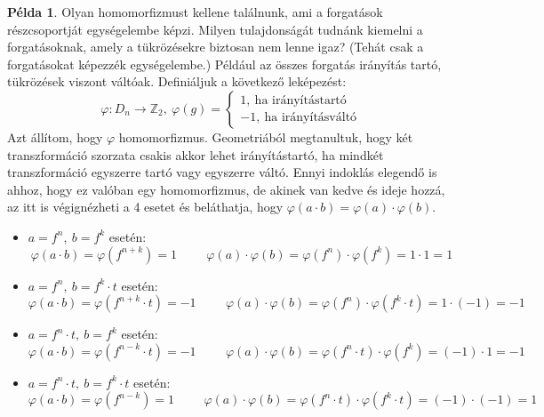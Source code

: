 \documentclass[12pt]{book}
\theoremstyle{plain} %
\theoremstyle{definition} %
\newtheorem{pl}{Példa}[section]
\theoremstyle{remark}
\numberwithin{equation}{section}  %
\def\Z{\mathbb{Z}}
\begin{document}
	\begin{pl}
		Olyan homomorfizmust kellene találnunk, ami a forgatások részcsoportját egységelembe képzi. Milyen tulajdonságát tudnánk kiemelni a forgatásoknak, amely a tükrözésekre biztosan nem lenne igaz? (Tehát csak a forgatásokat képezzék egységelembe.) Például az összes forgatás irányítás tartó, tükrözések viszont váltóak. Definiáljuk a következő leképezést:
		\[ \varphi\colon D_n \to \Z_2,\ \varphi(g) = 
		\begin{cases}
			1,\ \text{ha irányítástartó} \\
			-1,\ \text{ha irányításváltó}
		\end{cases}
		\]
		Azt állítom, hogy $\varphi$ homomorfizmus. Geometriából megtanultuk, hogy két transzformáció szorzata csakis akkor lehet irányítástartó, ha mindkét transzformáció egyszerre tartó vagy egyszerre váltó. Ennyi indoklás elegendő is ahhoz, hogy ez valóban egy homomorfizmus, de akinek van kedve és ideje hozzá, az itt is végignézheti a 4 esetet és beláthatja, hogy $\varphi(a\cdot b) = \varphi(a)\cdot \varphi(b)$.
		\begin{itemize}
			\item $a=f^n,\ b=f^k$ esetén: \[ \varphi(a\cdot b) = \varphi(f^{n+k}) = 1 \hspace{1cm} \varphi(a)\cdot \varphi(b) =  \varphi(f^n) \cdot \varphi(f^k) = 1\cdot 1 = 1 \]
			\item $a=f^n,\ b=f^k\cdot t$ esetén: \[ \varphi(a\cdot b) = \varphi(f^{n+k}\cdot t) = -1 \hspace{1cm} \varphi(a)\cdot \varphi(b) = \varphi(f^n) \cdot \varphi(f^k\cdot t) = 1\cdot (-1) = -1 \]
			\item $a=f^n\cdot t,\ b=f^k$ esetén: \[ \varphi(a\cdot b) = \varphi(f^{n-k}\cdot t) = -1 \hspace{1cm} \varphi(a)\cdot \varphi(b) = \varphi(f^n\cdot t) \cdot \varphi(f^k) = (-1)\cdot 1 = -1 \]
			\item $a=f^n\cdot t,\ b=f^k\cdot t$ esetén: \[ \varphi(a\cdot b) = \varphi(f^{n-k}) = 1 \hspace{1cm} \varphi(a)\cdot \varphi(b) =  \varphi(f^n\cdot t) \cdot \varphi(f^k\cdot t) = (-1)\cdot (-1) = 1 \]
		\end{itemize}
	\end{pl}
\end{document}

